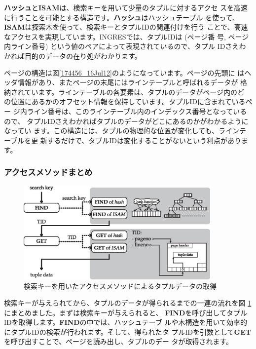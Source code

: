 {\bf ハッシュ}と{\bf ISAM}は、検索キーを用いて少量のタプルに対するアクセ
スを高速に行うことを可能とする構造です。{\bf ハッシュ}はハッシュテーブル
を使って、{\bf ISAM}は探索木を使って、検索キーとタプルIDの関連付けを行う
ことで、高速なアクセスを実現しています。INGRESでは、タプルIDは (ページ番
号, ページ内ライン番号) という値のペアによって表現されているので、タプル
IDさえわかれば目的のデータの在り処がわかります。

ページの構造は図\ref{174456_16Jul12}のようになっています。ページの先頭に
はヘッダ情報があり、またページの末尾にはラインテーブルと呼ばれるデータが
格納されています。ラインテーブルの各要素は、タプルのデータがページ内のど
の位置にあるかのオフセット情報を保持しています。タプルIDに含まれているペー
ジ内ライン番号は、このラインテーブル内のインデックス番号となっているので、
タプルIDさえわかればタプルのデータがどこにあるのかがわかるようになってい
ます。この構造には、タプルの物理的な位置が変化しても、ラインテーブルを更
新するだけで、タプルIDは変化することがないという利点があります。

\subsubsection{アクセスメソッドまとめ}

\begin{figure}
 \begin{center}
  \includegraphics[width=100mm]{hayamiz/images/access-method.eps}
  \caption{検索キーを用いたアクセスメソッドによるタプルデータの取得}
  \label{190817_16Jul12}
 \end{center}
\end{figure}

検索キーが与えられてから、タプルのデータが得られるまでの一連の流れを図
\ref{190817_16Jul12}にまとめました。まずは検索キーが与えられると、{\bf
FIND}を呼び出してタプルIDを取得します。{\bf FIND}の中では、ハッシュテーブ
ルや木構造を用いて効率的にタプルIDの検索が行われます。そして、得られたタ
プルIDを引数として{\bf GET}を呼び出すことで、ページを読み出し、タプルのデー
タが取得されます。

